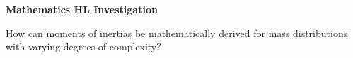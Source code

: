 \begin{titlepage}
    \begin{center}
        \vspace*{3cm}
        

        \Large
        \textbf{Mathematics HL Investigation}

        \vspace{0.5cm}

        How can moments of inertias be mathematically derived for mass distributions with varying degrees of complexity?
            
        \vfill
            
            
            
    \end{center}
\end{titlepage}